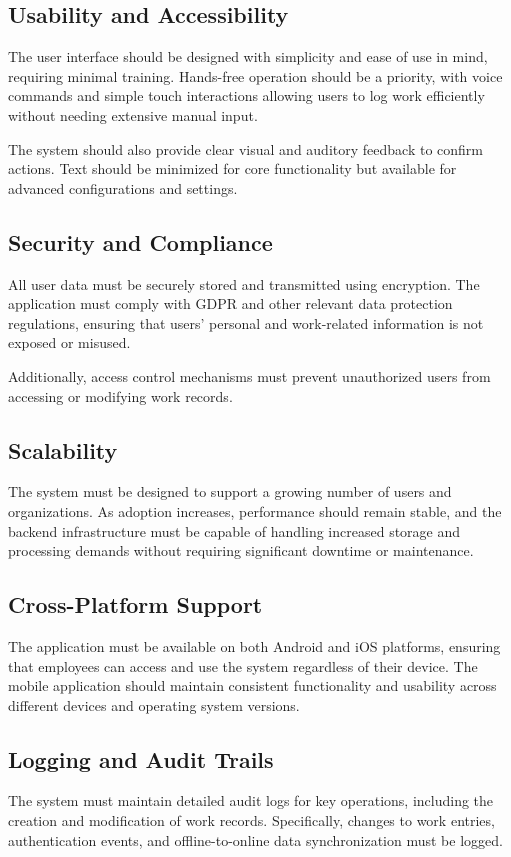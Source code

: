 \documentclass[
  digital,     %
  oneside,     %
  nosansbold,  %
  nocolorbold, %
  lof,         %
  lot,         %
]{fithesis4}
\begin{document}
\subsection{Usability and Accessibility}  
The user interface should be designed with simplicity and ease of use in mind, requiring minimal training. Hands-free operation should be a priority, with voice commands and simple touch interactions allowing users to log work efficiently without needing extensive manual input.  

The system should also provide clear visual and auditory feedback to confirm actions. Text should be minimized for core functionality but available for advanced configurations and settings.

\subsection{Security and Compliance}  
All user data must be securely stored and transmitted using encryption. The application must comply with GDPR and other relevant data protection regulations, ensuring that users’ personal and work-related information is not exposed or misused.  

Additionally, access control mechanisms must prevent unauthorized users from accessing or modifying work records.

\subsection{Scalability}  
The system must be designed to support a growing number of users and organizations. As adoption increases, performance should remain stable, and the backend infrastructure must be capable of handling increased storage and processing demands without requiring significant downtime or maintenance.

\subsection{Cross-Platform Support}  
The application must be available on both Android and iOS platforms, ensuring that employees can access and use the system regardless of their device. The mobile application should maintain consistent functionality and usability across different devices and operating system versions.

\subsection{Logging and Audit Trails}  
The system must maintain detailed audit logs for key operations, including the creation and modification of work records. Specifically, changes to work entries, authentication events, and offline-to-online data synchronization must be logged.  
\end{document}
